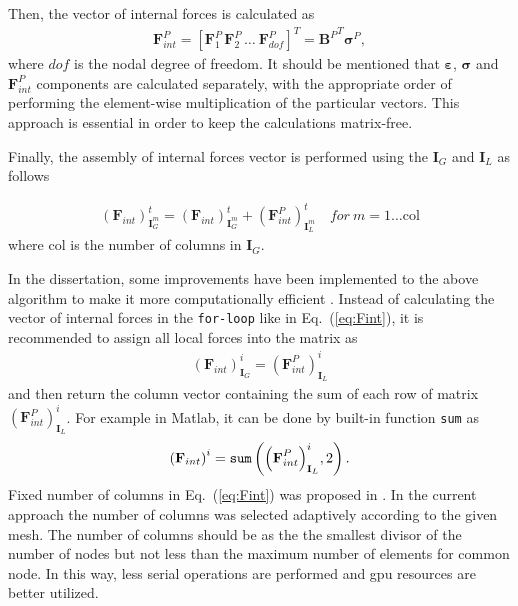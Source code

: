\documentclass[a4paper,fleqn]{cas-dc}
\begin{document}
Then, the vector of internal forces is calculated as
\begin{eqnarray}
	\label{eq:forces}
	\textbf{F}^P_{int}=\left[\textbf{F}^P_1\, \textbf{F}^P_2\, \ldots\ \textbf{F}^P_{dof} \right]^T={\textbf{B}^P}^T\boldsymbol{\sigma}^P,
\end{eqnarray}
where $dof$ is the nodal degree of freedom.
It should be mentioned that \(\boldsymbol{\varepsilon}\), \(\boldsymbol{\sigma}\) and \(\textbf{F}^P_{int}\) components are calculated separately, with the appropriate order of performing the element-wise multiplication of the particular vectors.
This approach is essential in order to keep the calculations matrix-free.

Finally, the assembly of internal forces vector is performed using the \(\textbf{I}_G\) and \(\textbf{I}_L\) as follows

\begin{eqnarray}
	\label{eq:Fint}
	{\left(\textbf{F}_{int}\right)}^t_{\textbf{I}^m_G} = {\left(\textbf{F}_{int}\right)}^t_{\textbf{I}^m_G} + {\left(\textbf{F}^P_{int}\right)}^t_{\textbf{I}^m_L}\quad for\ m=1\ldots \mathrm{col} 
\end{eqnarray}
where col is the number of columns in \(\textbf{I}_G\).

In the dissertation, some improvements have been implemented to the above algorithm to make it more computationally efficient \cite{fiborek2022spectral}.
Instead of calculating the vector of internal forces in the \verb+for-loop+ like in Eq.~(\ref{eq:Fint}), it is recommended to assign all local forces into the matrix as
\begin{eqnarray}
	\label{eq:Fmatrix}
	{\left(\textbf{F}_{int}\right)}^i_{\textbf{I}_G} ={\left(\textbf{F}^P_{int}\right)}^i_{\textbf{I}_L}
\end{eqnarray}
and then return the column vector containing the sum of each row of matrix \({\left(\textbf{F}^P_{int}\right)}^i_{\textbf{I}_L}\).
For example in Matlab, it can be done by built-in function \verb|sum| as
\begin{eqnarray}
	\label{eq:Fsum}
	{\left(\textbf{F}_{int}\right)}^i = \verb|sum| \left({\left(\textbf{F}^P_{int}\right)}^i_{\textbf{I}_L},2\right).
\end{eqnarray}
Fixed number of columns in Eq.~(\ref{eq:Fint}) was proposed in \cite{kudela2016parallel}.
In the current approach the number of columns was selected adaptively according to the given mesh.
The number of columns should be as the the smallest divisor of the number of nodes but not less than the maximum number of elements for common node.
In this way, less serial operations are performed and \ac{gpu} resources are better utilized.
\end{document}
